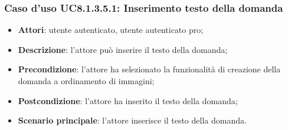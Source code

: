 \subsubsection{Caso d'uso UC8.1.3.5.1: Inserimento testo della domanda}
\begin{itemize}
	\item\textbf{Attori}: utente autenticato, utente autenticato pro;
	\item\textbf{Descrizione}: l'attore può inserire il testo della domanda;
	\item\textbf{Precondizione}: l'attore ha selezionato la funzionalità di creazione della domanda a ordinamento di immagini; 
	\item \textbf{Postcondizione}: l'attore ha inserito il testo della domanda;
	\item\textbf{Scenario principale}: l'attore inserisce il testo della domanda. 
\end{itemize}

